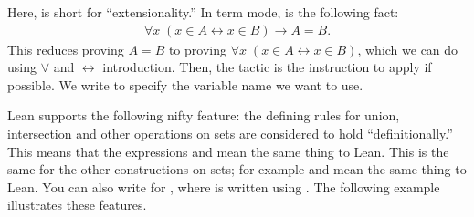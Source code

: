 \documentclass[letterpaper,10pt,english]{sphinxmanual}
\begin{document}
\sphinxAtStartPar
Here,  is short for “extensionality.”
In term mode,  is the following fact:
\begin{equation*}
\begin{split}\forall x \; (x \in A \leftrightarrow x \in B) \to A = B.\end{split}
\end{equation*}
\sphinxAtStartPar
This reduces proving \(A = B\) to proving \(\forall x \; (x \in A \leftrightarrow x \in B)\), which we can do using \(\forall\) and \(\leftrightarrow\) introduction.
Then, the tactic  is the instruction to apply  if possible.
We write  to specify the variable name we want to use.

\sphinxAtStartPar
Lean supports the following nifty feature: the defining rules for union,
intersection and other operations on sets are considered to hold “definitionally.”
This means that the expressions  and 
mean the same thing to Lean.
This is the same for the other constructions on sets;
for example  and 
mean the same thing to Lean.
You can also write  for ,
where  is written using .
The following example illustrates these features.
\end{document}
